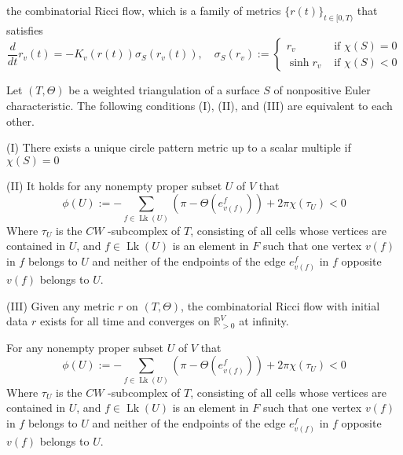 \begin{definition}
  \label{combinatorial-ricci-flow}
  the combinatorial Ricci flow, which is a family of metrics $\{r (t)\}_{t \in[0, T)}$ that satisfies
  $$
  \frac{d}{d t} r_{v}(t)=-K_{v}(r(t)) \sigma_{S}\left(r_{v}(t)\right), \quad \sigma_{S}\left(r_{v}\right):=\left\{\begin{array}{ll}
  r_{v} & \text { if } \chi(S)=0 \\
  \sinh r_{v} & \text { if } \chi(S)<0
  \end{array}\right.
  $$
\end{definition}

\begin{theorem}
  \label{thurston-chow-luo}
  Let $(T, \Theta)$ be a weighted triangulation of a surface $S$ of nonpositive Euler characteristic. The following conditions (I), (II), and (III) are equivalent to each other.

  (I) There exists a unique circle pattern metric up to a scalar multiple if $\chi (S)=0$

  (II) It holds for any nonempty proper subset $U$ of $V$ that
  $$
  \phi(U):=-\sum_{f \in \operatorname{Lk}(U)}\left(\pi-\Theta\left(e_{v(f)}^{f}\right)\right)+2 \pi \chi\left(\tau_{U}\right)<0
  $$
  Where $\tau_{U}$ is the $C W$ -subcomplex of $T$, consisting of all cells whose vertices are contained in $U$, and $f \in \operatorname{Lk}(U)$ is an element in $F$ such that one vertex $v (f)$ in $f$ belongs to $U$ and neither of the endpoints of the edge $e_{v (f)}^{f}$ in $f$ opposite $v (f)$ belongs to $U$.

  (III) Given any metric $r$ on $(T, \Theta)$, the combinatorial Ricci flow with initial data $r$ exists for all time and converges on $\mathbb{R}_{>0}^{V}$ at infinity.
\end{theorem}

\begin{definition}
  \label{phi-def} 
  For any nonempty proper subset $U$ of $V$ that
  $$
  \phi(U):=-\sum_{f \in \operatorname{Lk}(U)}\left(\pi-\Theta\left(e_{v(f)}^{f}\right)\right)+2 \pi \chi\left(\tau_{U}\right)<0
  $$
  Where $\tau_{U}$ is the $C W$ -subcomplex of $T$, consisting of all cells whose vertices are contained in $U$, and $f \in \operatorname{Lk}(U)$ is an element in $F$ such that one vertex $v (f)$ in $f$ belongs to $U$ and neither of the endpoints of the edge $e_{v (f)}^{f}$ in $f$ opposite $v (f)$ belongs to $U$.
\end{definition}

